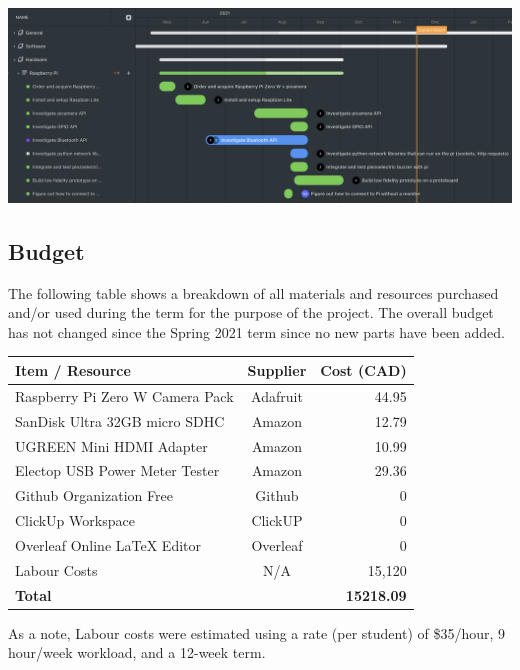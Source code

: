 \documentclass[a4paper,11pt]{article}
\begin{document}
\begin{center}
    \includegraphics[width={1.0\linewidth}]{img/hardware-gantt.png}
\end{center}

\subsection{Budget}
The following table shows a breakdown of all materials and resources purchased and/or used during the term for the purpose of the project. The overall budget has not changed since the Spring 2021 term since no new parts have been added.

\begin{table}[ht]
    \centering
    \begin{tabular}{|l|c|r|}
        \hline
        
        \textbf{Item / Resource} & \textbf{Supplier} & \textbf{Cost (CAD)}
        \\ \hline
        Raspberry Pi Zero W Camera Pack & Adafruit      & 44.95
        \\ \hline
        SanDisk Ultra 32GB micro SDHC   & Amazon        & 12.79
        \\ \hline
        UGREEN Mini HDMI Adapter        & Amazon        & 10.99
        \\ \hline
        Electop USB Power Meter Tester  & Amazon        & 29.36
        \\ \hline
        Github Organization Free        & Github        & 0
        \\ \hline
        ClickUp Workspace               & ClickUP       & 0
        \\ \hline
        Overleaf Online LaTeX Editor    & Overleaf      & 0
        \\ \hline
        Labour Costs                    & N/A           & 15,120
        \\ \hline
        \textbf{Total}                  & \multicolumn{2}{r|}{\textbf{15218.09}}
        \\ \hline
    \end{tabular}
    \label{Tab:budget}
\end{table}
As a note, Labour costs were estimated using a rate (per student) of \$35/hour, 9 hour/week workload, and a 12-week term.
\end{document}
